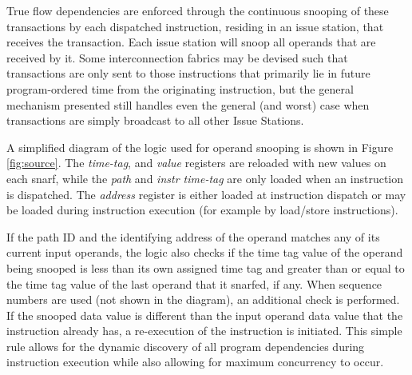 \documentclass[10pt,dvips]{article}
\begin{document}
True flow dependencies are enforced through the continuous snooping of
these transactions by each dispatched instruction, residing in an issue
station, that receives the transaction.
Each issue station
will snoop all operands that are received by it.
Some 
interconnection fabrics may be devised such that
transactions are only sent to those instructions that primarily
lie in future program-ordered time from the originating instruction,
but the general mechanism presented 
still handles even the general (and worst)
case when transactions are simply broadcast to all other Issue Stations.  

A simplified diagram of the logic used for operand snooping
is shown in Figure \ref{fig:source}.
The {\em time-tag}, and
{\em value} registers are reloaded with new values on each snarf,
while the
{\em path} and
{\em instr time-tag} are only loaded when an instruction is
dispatched.
The {\em address} register is either loaded at instruction
dispatch or may be loaded during instruction execution
(for example by load/store instructions).
%
\begin{figure*}
\centering
{}
\caption{{\em Snooping for operand updates.} 
The registers and snooping
operation of one of several possible source operands is shown.
This logic would reside in an operand block within an issue slot.
Just one operand forwarding bus is shown being snooped but
typically several forwarding buses are snooped simultaneously.}
\label{fig:source}
\end{figure*}
%
If the
path ID and the identifying address of the operand matches any of
its current input operands, the logic also checks
if the time tag value of the operand being snooped
is less than its own assigned time tag
and greater than or equal to the time tag value of the last
operand that it snarfed, if any.  
When sequence numbers are used (not shown in the diagram),
an additional check is performed.
If the snooped data value is
different than the input operand data value that the instruction 
already has, a re-execution of the instruction is initiated.
This simple rule allows for the dynamic discovery of
all program dependencies during instruction execution while 
also allowing for maximum concurrency to occur.
%
%
\end{document}
